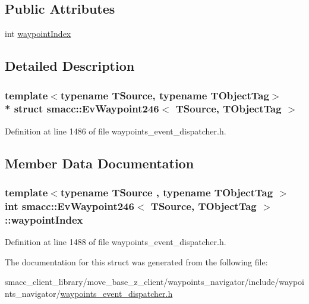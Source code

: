 \subsection*{Public Attributes}
\begin{DoxyCompactItemize}
\item 
int \hyperlink{structsmacc_1_1EvWaypoint246_a79b4170f5b5028b28ad7f011b818c757}{waypoint\+Index}
\end{DoxyCompactItemize}


\subsection{Detailed Description}
\subsubsection*{template$<$typename T\+Source, typename T\+Object\+Tag$>$\\*
struct smacc\+::\+Ev\+Waypoint246$<$ T\+Source, T\+Object\+Tag $>$}



Definition at line 1486 of file waypoints\+\_\+event\+\_\+dispatcher.\+h.



\subsection{Member Data Documentation}
\subsubsection[{\texorpdfstring{waypoint\+Index}{waypointIndex}}]{\setlength{\rightskip}{0pt plus 5cm}template$<$typename T\+Source , typename T\+Object\+Tag $>$ int {\bf smacc\+::\+Ev\+Waypoint246}$<$ T\+Source, T\+Object\+Tag $>$\+::waypoint\+Index}\hypertarget{structsmacc_1_1EvWaypoint246_a79b4170f5b5028b28ad7f011b818c757}{}\label{structsmacc_1_1EvWaypoint246_a79b4170f5b5028b28ad7f011b818c757}


Definition at line 1488 of file waypoints\+\_\+event\+\_\+dispatcher.\+h.



The documentation for this struct was generated from the following file\+:\begin{DoxyCompactItemize}
\item 
smacc\+\_\+client\+\_\+library/move\+\_\+base\+\_\+z\+\_\+client/waypoints\+\_\+navigator/include/waypoints\+\_\+navigator/\hyperlink{waypoints__event__dispatcher_8h}{waypoints\+\_\+event\+\_\+dispatcher.\+h}\end{DoxyCompactItemize}
